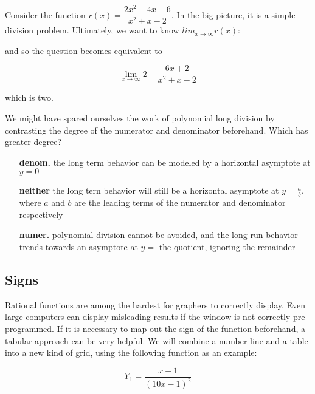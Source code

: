 Consider the function $r(x) = \dfrac{2x^2-4x-6}{x^2+x-2}$.  In the big picture, 
it is a simple division problem.  Ultimately, we want to know $lim_{x\rightarrow\infty} 
r(x)$:


and so the question becomes equivalent to 

$$
\lim_{x\rightarrow\infty} 2-\frac{6x+2}{x^2+x-2}
$$

which is two.

We might have spared ourselves the work of polynomial long division by contrasting the degree
of the numerator and denominator beforehand.  Which has greater degree?
\begin{itemize}
\item[\textbf{denom.}] the long term behavior can be modeled by a horizontal asymptote at $y=0$
\item[\textbf{neither}] the long tern behavior will still be a horizontal asymptote at $y=\frac{a}{b}$, where $a$ and $b$ are the leading terms of the numerator and denominator respectively
\item[\textbf{numer.}] polynomial division cannot be avoided, and the long-run behavior trends towards an asymptote at $y=$ the quotient, ignoring the remainder
\end{itemize}

\subsection{Signs}
Rational functions are among the hardest for graphers to correctly display.  
Even large computers can display misleading results if the window is not correctly 
pre-programmed.  If it is necessary to map out the sign of the function beforehand,
a tabular approach can be very helpful.  We will combine a number line and a table
into a new kind of grid, using the following function as an example:

$$Y_1=\frac{x+1}{(10x-1)^2}$$

